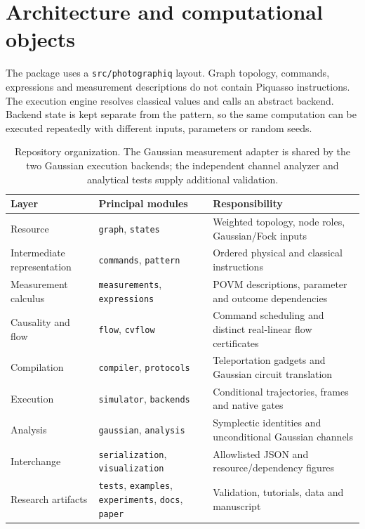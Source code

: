 \documentclass[a4paper,twocolumn,11pt,nopdfoutputerror]{quantumarticle}
\begin{document}
\section{Architecture and computational objects}
\label{sec:architecture}

The package uses a \texttt{src/photographiq} layout. Graph topology, commands,
expressions and measurement descriptions do not contain Piquasso instructions.
The execution engine resolves classical values and calls an abstract backend.
Backend state is kept separate from the pattern, so the same computation can be
executed repeatedly with different inputs, parameters or random seeds.

\begin{table}[t]
\centering\small
\begin{tabularx}{\textwidth}{p{}p{}X}
\toprule
Layer & Principal modules & Responsibility \\
\midrule
Resource & \texttt{graph}, \texttt{states} & Weighted topology, node roles, Gaussian/Fock inputs \\
Intermediate representation & \texttt{commands}, \texttt{pattern} & Ordered physical and classical instructions \\
Measurement calculus & \texttt{measurements}, \texttt{expressions} & POVM descriptions, parameter and outcome dependencies \\
Causality and flow & \texttt{flow}, \texttt{cvflow} & Command scheduling and distinct real-linear flow certificates \\
Compilation & \texttt{compiler}, \texttt{protocols} & Teleportation gadgets and Gaussian circuit translation \\
Execution & \texttt{simulator}, \texttt{backends} & Conditional trajectories, frames and native gates \\
Analysis & \texttt{gaussian}, \texttt{analysis} & Symplectic identities and unconditional Gaussian channels \\
Interchange & \texttt{serialization}, \texttt{visualization} & Allowlisted JSON and resource/dependency figures \\
Research artifacts & \texttt{tests}, \texttt{examples}, \texttt{experiments}, \texttt{docs}, \texttt{paper} & Validation, tutorials, data and manuscript \\
\bottomrule
\end{tabularx}
\caption{Repository organization. The Gaussian measurement adapter is shared by
the two Gaussian execution backends; the independent channel analyzer and
analytical tests supply additional validation.}
\label{tab:modules}
\end{table}
\end{document}
